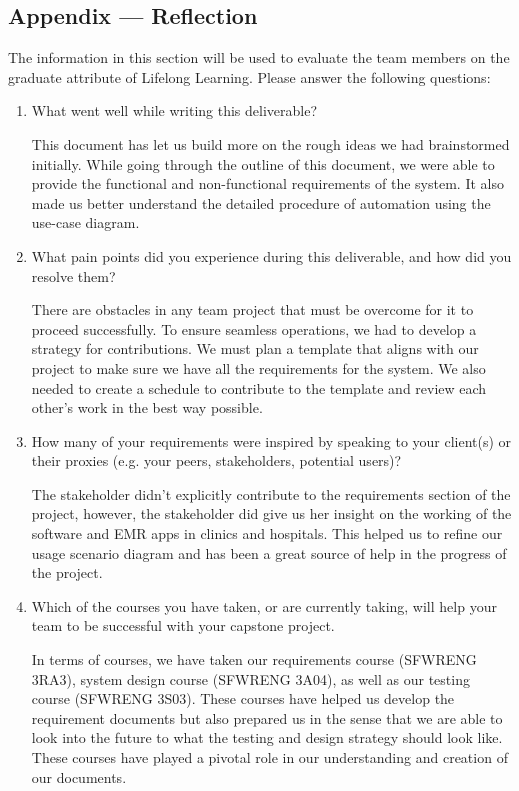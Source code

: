 \documentclass[12pt]{article}
\begin{document}
\begin{itemize}
\begin{itemize}
\newpage{}
\section*{Appendix --- Reflection}

The information in this section will be used to evaluate the team members on the
graduate attribute of Lifelong Learning.  Please answer the following questions:

\begin{enumerate}
  \item What went well while writing this deliverable?
  
  This document has let us build more on the rough ideas we had brainstormed initially. While going through the outline of this document, we were able to provide the functional and non-functional requirements of the system. It also made us better understand the detailed procedure of automation using the use-case diagram. 

  \item What pain points did you experience during this deliverable, and how did
  you resolve them?

  There are obstacles in any team project that must be overcome for it to proceed successfully. To ensure seamless operations, we had to develop a strategy for contributions. We must plan a template that aligns with our project to make sure we have all the requirements for the system. We also needed to create a schedule to contribute to the template and review each other's work in the best way possible.
  
  \item How many of your requirements were inspired by speaking to your
  client(s) or their proxies (e.g. your peers, stakeholders, potential users)?

  The stakeholder didn't explicitly contribute to the requirements section of the project, however, the stakeholder did give us her insight on the working of the software and EMR apps in clinics and hospitals. This helped us to refine our usage scenario diagram and has been a great source of help in the progress of the project.

  \item Which of the courses you have taken, or are currently taking, will help
  your team to be successful with your capstone project.

  In terms of courses, we have taken our requirements course (SFWRENG 3RA3), system design course (SFWRENG 3A04), as well as our testing course (SFWRENG 3S03). These courses have helped us develop the requirement documents but also prepared us in the sense that we are able to look into the future to what the testing and design strategy should look like. These courses have played a pivotal role in our understanding and creation of our documents. 


\end{enumerate}
\end{itemize}
\end{itemize}
\end{document}
